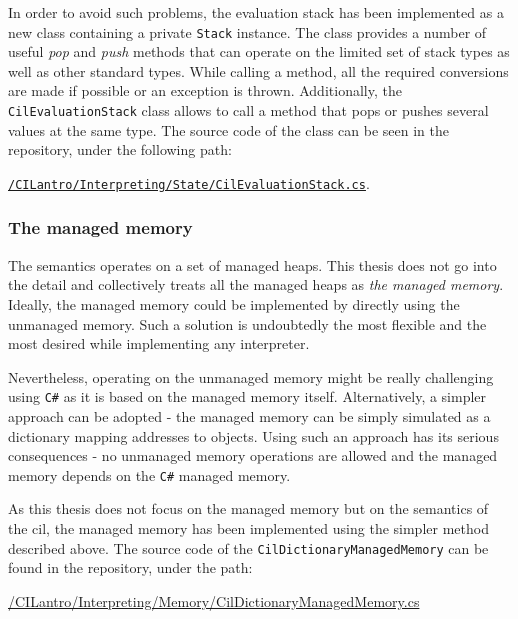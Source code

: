 \documentclass{article}
\numberwithin{equation}{section}
\begin{document}
In order to avoid such problems, the evaluation stack has been implemented as a new class containing a private \texttt{Stack} instance. The class provides a number of useful \textit{pop} and \textit{push} methods that can operate on the limited set of stack types as well as other standard types. While calling a method, all the required conversions are made if possible or an exception is thrown. Additionally, the \texttt{CilEvaluationStack} class allows to call a method that pops or pushes several values at the same type. The source code of the class can be seen in the repository, under the following path: 
\begin{center}
\href{https://github.com/kvasnyk/CILantro/blob/master/CILantro/CILantro/Interpreting/State/CilEvaluationStack.cs}{\texttt{/CILantro/Interpreting/State/CilEvaluationStack.cs}}.
\end{center}

\subsubsection{The managed memory}

The semantics operates on a set of managed heaps. This thesis does not go into the detail and collectively treats all the managed heaps as \textit{the managed memory}. Ideally, the managed memory could be implemented by directly using the unmanaged memory. Such a solution is undoubtedly the most flexible and the most desired while implementing any interpreter.

Nevertheless, operating on the unmanaged memory might be really challenging using \texttt{C\#} as it is based on the managed memory itself. Alternatively, a simpler approach can be adopted - the managed memory can be simply simulated as a dictionary mapping addresses to objects. Using such an approach has its serious consequences - no unmanaged memory operations are allowed and the managed memory depends on the \texttt{C\#} managed memory.

As this thesis does not focus on the managed memory but on the semantics of the \acrshort{cil}, the managed memory has been implemented using the simpler method described above. The source code of the \texttt{CilDictionaryManagedMemory} can be found in the repository, under the path:
\begin{center}
	\href{https://github.com/kvasnyk/CILantro/blob/master/CILantro/CILantro/Interpreting/Memory/CilDictionaryManagedMemory.cs}{/CILantro/Interpreting/Memory/CilDictionaryManagedMemory.cs}
\end{center}
\end{document}
